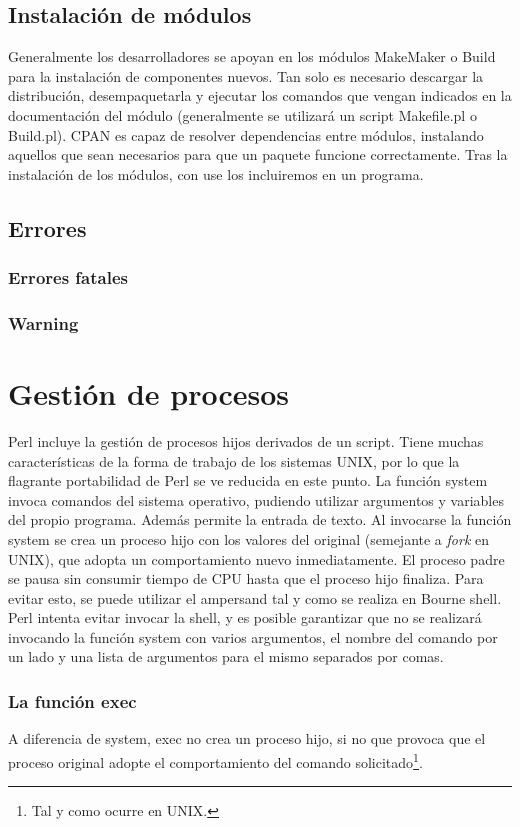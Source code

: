 \documentclass[12pt,a4paper]{memoir}
\begin{document}
	\section{Instalación de módulos}
	Generalmente los desarrolladores se apoyan en los módulos MakeMaker o Build para la instalación de componentes nuevos. Tan solo es necesario descargar la distribución, desempaquetarla y ejecutar los comandos que vengan indicados en la documentación del módulo (generalmente se utilizará un script Makefile.pl o Build.pl).
	CPAN es capaz de resolver dependencias entre módulos, instalando aquellos que sean necesarios para que un paquete funcione correctamente.
	Tras la instalación de los módulos, con use los incluiremos en un programa.
	\section{Errores}
	\subsection{Errores fatales}
	\subsection{Warning}
	
	\chapter{Gestión de procesos}
	Perl incluye la gestión de procesos hijos derivados de un script. Tiene muchas características de la forma de trabajo de los sistemas UNIX, por lo que la flagrante portabilidad de Perl se ve reducida en este punto.
	La función system invoca comandos del sistema operativo, pudiendo utilizar argumentos y variables del propio programa. Además permite la entrada de texto.
	Al invocarse la función system se crea un proceso hijo con los valores del original (semejante a \textit{fork} en UNIX), que adopta un comportamiento nuevo inmediatamente. El proceso padre se pausa sin consumir tiempo de CPU hasta que el proceso hijo finaliza. Para evitar esto, se puede utilizar el ampersand tal y como se realiza en Bourne shell.
	Perl intenta evitar invocar la shell, y es posible garantizar que no se realizará invocando la función system con varios argumentos, el nombre del comando por un lado y una lista de argumentos para el mismo separados por comas.
	\subsection{La función exec}
	A diferencia de system, exec no crea un proceso hijo, si no que provoca que el proceso original adopte el comportamiento del comando solicitado\footnote{Tal y como ocurre en UNIX.}.
\end{document}
